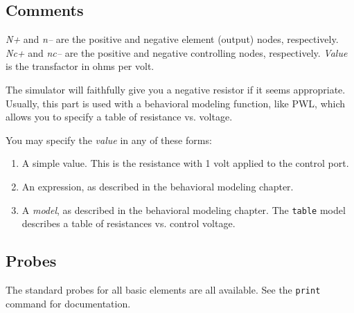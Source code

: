 \subsection{Comments}

{\it N+} and {\it n--} are the positive and negative element (output) nodes,
respectively.  {\it Nc+} and {\it nc--} are the positive and negative
controlling nodes, respectively.  {\it Value} is the transfactor in
ohms per volt.

The simulator will faithfully give you a negative resistor if it
seems appropriate.  Usually, this part is used with a behavioral
modeling function, like PWL, which allows you to specify a table of
resistance vs. voltage.

You may specify the {\it value} in any of these forms:

\begin{enumerate}
  
\item
A simple value.  This is the resistance with 1 volt applied
to the control port.
  
\item
An expression, as described in the behavioral modeling chapter.

\item
A {\it model}, as described in the behavioral modeling chapter.  The
{\tt table} model describes a table of resistances vs. control voltage.

\end{enumerate}
\subsection{Probes}

The standard probes for all basic elements are all available.  See the
{\tt print} command for documentation.
